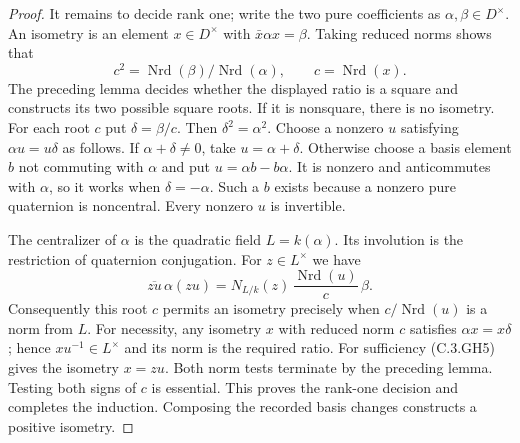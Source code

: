 \begin{proof}
It remains to decide rank one;
write the two pure coefficients
as $\alpha,\beta\in D^\times$.
An isometry is an element $x\in D^\times$
with $\bar x\alpha x=\beta$.
Taking reduced norms shows that
\[
                    c^2=\operatorname{Nrd}(\beta)/
                              \operatorname{Nrd}(\alpha),
                    \qquad c=\operatorname{Nrd}(x).
                                                               \tag{C.3.GH4}
\]
The preceding lemma decides whether
the displayed ratio is a square
and constructs its two possible
square roots.  If it is nonsquare,
there is no isometry.
For each root $c$ put $\delta=\beta/c$.
Then $\delta^2=\alpha^2$.
Choose a nonzero $u$ satisfying
$\alpha u=u\delta$ as follows.
If $\alpha+\delta\ne0$, take
$u=\alpha+\delta$.
Otherwise choose a basis element
$b$ not commuting with $\alpha$
and put $u=\alpha b-b\alpha$.
It is nonzero and anticommutes
with $\alpha$, so it works when
$\delta=-\alpha$.
Such a $b$ exists because a
nonzero pure quaternion is
noncentral.
Every nonzero $u$ is invertible.

The centralizer of $\alpha$ is
the quadratic field $L=k(\alpha)$.
Its involution is the restriction
of quaternion conjugation.
For $z\in L^\times$ we have
\[
 \overline{zu}\,\alpha(zu)
       =N_{L/k}(z)\,
          \frac{\operatorname{Nrd}(u)}{c}\,\beta .
                                                               \tag{C.3.GH5}
\]
Consequently this root $c$
permits an isometry precisely when
$c/\operatorname{Nrd}(u)$ is a
norm from $L$.
For necessity, any isometry $x$
with reduced norm $c$ satisfies
$\alpha x=x\delta$; hence
$xu^{-1}\in L^\times$ and its
norm is the required ratio.
For sufficiency (C.3.GH5) gives
the isometry $x=zu$.
Both norm tests terminate by
the preceding lemma.
Testing both signs of $c$ is
essential.
This proves the rank-one decision
and completes the induction.
Composing the recorded basis
changes constructs a positive
isometry.
\end{proof}

